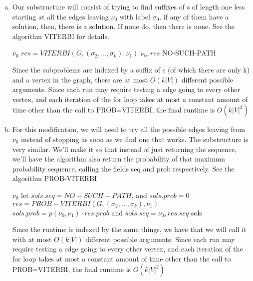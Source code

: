 \documentclass{article}
\begin{document}
\begin{enumerate}[a.]
\item Our substructure will consist of trying to find suffixes of s of length one less starting at all the edges leaving $\nu_0$ with label $\sigma_0$. if any of them have a solution, then, there is a solution. If none do, then there is none. See the algorithm VITERBI for details.
\begin{algorithm}
\caption{$VITERBI(G,s,\nu_0)$}
\begin{algorithmic}
\State \Return $\nu_0$
\EndIf
{}
\State $res = VITERBI(G,(\sigma_2, \ldots, \sigma_k), \nu_1)$
\State \Return $\nu_0, res$
\EndIf
\EndIf
\EndFor
\State \Return NO-SUCH-PATH
\end{algorithmic}
\end{algorithm}

Since the subproblems are indexed by a suffix of s (of which there are only k) and a vertex in the graph, there are at most $O(k|V|)$ different possible arguments. Since each run may require testing a edge going to every other vertex, and each iteration of the for loop takes at most a constant amount of time other than the call to PROB=VITERBI, the final runtime is $O(k|V|^2)$

\item
For this modification, we will need to try all the possible edges leaving from $\nu_0$ instead of stopping as soon as we find one that works. The substructure is very similar. We'll make it so that instead of just returning the sequence, we'll have the algorithm also return the probability of that maximum probability sequence, calling the fields seq and prob respectively. See the algorithm PROB-VITERBI
\begin{algorithm}
\caption{$PROB-VITERBI(G,s,\nu_0)$}
\begin{algorithmic}
\State \Return $\nu_0$
\EndIf
\State let $sols.seq = NO-SUCH-PATH$, and $sols.prob = 0$
\State $res = PROB-VITERBI(G,(\sigma_2, \ldots, \sigma_k), \nu_1)$
\State $sols.prob = p(\nu_0,\nu_1)\cdot res.prob$ and $sols.seq = \nu_0,res.seq$
\EndIf
\EndIf
\EndFor
\State \Return sols
\end{algorithmic}
\end{algorithm}

Since the runtime is indexed by the same things, we have that we will call it with at most $O(k|V|)$ different possible arguments. Since each run may require testing a edge going to every other vertex, and each iteration of the for loop takes at most a constant amount of time other than the call to PROB=VITERBI, the final runtime is $O(k|V|^2)$

\end{enumerate}
\end{document}
